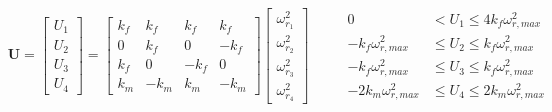 \documentclass[journal,11pt,onecolumn,draftclsnofoot,]{IEEEtran}
\begin{document}
\begin{equation}
\label{eq:controls}
\begin{split}
\begin{matrix}
\begin{matrix}
\boldsymbol{U}=
\begin{bmatrix}
U_1\\ U_2\\ U_3\\ U_4
\end{bmatrix}
=
\begin{bmatrix}
k_f & k_f & k_f & k_f\\ 
0 & k_f & 0 & -k_f\\ 
k_f & 0 & -k_f & 0\\ 
k_m & -k_m & k_m & -k_m
\end{bmatrix}
\begin{bmatrix}
\omega _{r_1}^2\\ 
\omega _{r_2}^2\\ 
\omega _{r_3}^2\\ 
\omega _{r_4}^2
\end{bmatrix}\\
\end{matrix}
& \;\;\;\;
\begin{matrix}
0 &< U_1 \le 4 k_f \omega_{r,max}^2 \\
-k_f \omega_{r,max}^2 &\le U_2 \le k_f \omega_{r,max}^2 \\
-k_f \omega_{r,max}^2 &\le U_3 \le k_f \omega_{r,max}^2 \\
-2 k_m \omega_{r,max}^2 &\le U_4 \le 2 k_m \omega_{r,max}^2 \\
\end{matrix}
\end{matrix}
\end{split}
\end{equation}
\end{document}
